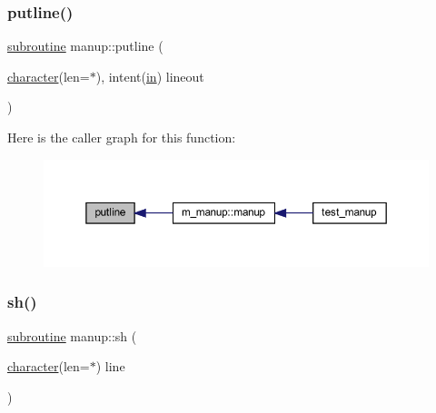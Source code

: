 \subsubsection{\texorpdfstring{putline()}{putline()}}
{\footnotesize\ttfamily \hyperlink{M__stopwatch_83_8txt_acfbcff50169d691ff02d4a123ed70482}{subroutine} manup\+::putline (\begin{DoxyParamCaption}\item[{\hyperlink{option__stopwatch_83_8txt_abd4b21fbbd175834027b5224bfe97e66}{character}(len=$\ast$), intent(\hyperlink{M__journal_83_8txt_afce72651d1eed785a2132bee863b2f38}{in})}]{lineout }\end{DoxyParamCaption})\hspace{0.3cm}{\ttfamily [private]}}

Here is the caller graph for this function\+:
\nopagebreak
\begin{figure}[H]
\begin{center}
\leavevmode
\includegraphics[width=350pt]{manup_8f90_a4b6c4dc9df113c44655bdf0f96ed6018_icgraph}
\end{center}
\end{figure}
\mbox{\label{manup_8f90_ae720ba239fabc9a2eefd18acea10cc90}} 
\subsubsection{\texorpdfstring{sh()}{sh()}}
{\footnotesize\ttfamily \hyperlink{M__stopwatch_83_8txt_acfbcff50169d691ff02d4a123ed70482}{subroutine} manup\+::sh (\begin{DoxyParamCaption}\item[{\hyperlink{option__stopwatch_83_8txt_abd4b21fbbd175834027b5224bfe97e66}{character}(len=$\ast$)}]{line }\end{DoxyParamCaption})\hspace{0.3cm}{\ttfamily [private]}}

